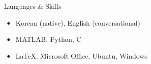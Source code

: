 \begin{rSection}{Languages \& Skills}
  \begin{itemize}
  \item Korean (native), English (conversational)
  \item MATLAB, Python, C
  \item \LaTeX, Microsoft Office, Ubuntu, Windows
  \end{itemize}
\end{rSection}
